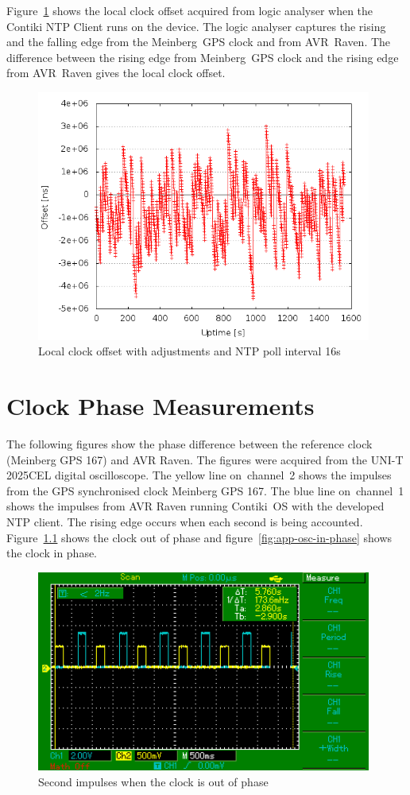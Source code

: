 Figure~\ref{fig:app-ntp-la} shows the local clock offset
acquired from logic analyser when the Contiki NTP Client runs on the device.
The logic analyser captures the rising and the falling edge
from the Meinberg~GPS clock and from AVR~Raven.
The difference between the rising edge from
Meinberg~GPS clock and the rising edge from AVR~Raven gives the local clock offset.
\begin{figure}[H]
  \centering
  \includegraphics[width=11cm,keepaspectratio]{fig/la.png}
  \caption{Local clock offset with adjustments and NTP poll interval 16s}
  \label{fig:app-ntp-la}
\end{figure}


\chapter{Clock Phase Measurements}\label{app:phase}
The following figures show the phase difference between
the reference clock (Meinberg GPS 167) and AVR Raven.
The figures were acquired from the UNI-T 2025CEL digital oscilloscope.
The yellow line on~channel~2 shows the impulses from the GPS synchronised clock Meinberg GPS 167.
The blue line on~channel~1 shows the impulses from AVR Raven running
Contiki~OS with the developed NTP client.
The rising edge occurs when each second is being accounted.
Figure~\ref{fig:app-osc-out-of-phase} shows the clock out of phase
and figure~\ref{fig:app-osc-in-phase} shows the clock in phase.
\begin{figure}[ht]
  \centering
  \includegraphics[width=11cm,keepaspectratio]{fig/osc-out-of-phase.png}
  \caption{Second impulses when the clock is out of phase}
  \label{fig:app-osc-out-of-phase}
  \bigskip
\end{figure}

